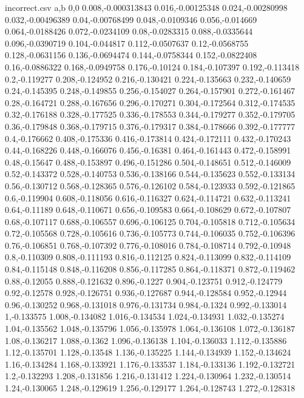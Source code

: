 \begin{filecontents*}{incorrect.csv}
a,b
0,0
0.008,-0.000313843
0.016,-0.00125348
0.024,-0.00280998
0.032,-0.00496389
0.04,-0.00768499
0.048,-0.0109346
0.056,-0.014669
0.064,-0.0188426
0.072,-0.0234109
0.08,-0.0283315
0.088,-0.0335644
0.096,-0.0390719
0.104,-0.044817
0.112,-0.0507637
0.12,-0.0568755
0.128,-0.0631156
0.136,-0.0694474
0.144,-0.0758344
0.152,-0.0822408
0.16,-0.0886322
0.168,-0.0949758
0.176,-0.10124
0.184,-0.107397
0.192,-0.113418
0.2,-0.119277
0.208,-0.124952
0.216,-0.130421
0.224,-0.135663
0.232,-0.140659
0.24,-0.145395
0.248,-0.149855
0.256,-0.154027
0.264,-0.157901
0.272,-0.161467
0.28,-0.164721
0.288,-0.167656
0.296,-0.170271
0.304,-0.172564
0.312,-0.174535
0.32,-0.176188
0.328,-0.177525
0.336,-0.178553
0.344,-0.179277
0.352,-0.179705
0.36,-0.179848
0.368,-0.179715
0.376,-0.179317
0.384,-0.178666
0.392,-0.177777
0.4,-0.176662
0.408,-0.175336
0.416,-0.173814
0.424,-0.172111
0.432,-0.170243
0.44,-0.168226
0.448,-0.166076
0.456,-0.16381
0.464,-0.161443
0.472,-0.158991
0.48,-0.15647
0.488,-0.153897
0.496,-0.151286
0.504,-0.148651
0.512,-0.146009
0.52,-0.143372
0.528,-0.140753
0.536,-0.138166
0.544,-0.135623
0.552,-0.133134
0.56,-0.130712
0.568,-0.128365
0.576,-0.126102
0.584,-0.123933
0.592,-0.121865
0.6,-0.119904
0.608,-0.118056
0.616,-0.116327
0.624,-0.114721
0.632,-0.113241
0.64,-0.11189
0.648,-0.110671
0.656,-0.109583
0.664,-0.108629
0.672,-0.107807
0.68,-0.107117
0.688,-0.106557
0.696,-0.106125
0.704,-0.105818
0.712,-0.105634
0.72,-0.105568
0.728,-0.105616
0.736,-0.105773
0.744,-0.106035
0.752,-0.106396
0.76,-0.106851
0.768,-0.107392
0.776,-0.108016
0.784,-0.108714
0.792,-0.10948
0.8,-0.110309
0.808,-0.111193
0.816,-0.112125
0.824,-0.113099
0.832,-0.114109
0.84,-0.115148
0.848,-0.116208
0.856,-0.117285
0.864,-0.118371
0.872,-0.119462
0.88,-0.12055
0.888,-0.121632
0.896,-0.1227
0.904,-0.123751
0.912,-0.124779
0.92,-0.12578
0.928,-0.126751
0.936,-0.127687
0.944,-0.128584
0.952,-0.12944
0.96,-0.130252
0.968,-0.131018
0.976,-0.131734
0.984,-0.1324
0.992,-0.133014
1,-0.133575
1.008,-0.134082
1.016,-0.134534
1.024,-0.134931
1.032,-0.135274
1.04,-0.135562
1.048,-0.135796
1.056,-0.135978
1.064,-0.136108
1.072,-0.136187
1.08,-0.136217
1.088,-0.1362
1.096,-0.136138
1.104,-0.136033
1.112,-0.135886
1.12,-0.135701
1.128,-0.13548
1.136,-0.135225
1.144,-0.134939
1.152,-0.134624
1.16,-0.134284
1.168,-0.133921
1.176,-0.133537
1.184,-0.133136
1.192,-0.132721
1.2,-0.132293
1.208,-0.131856
1.216,-0.131412
1.224,-0.130964
1.232,-0.130514
1.24,-0.130065
1.248,-0.129619
1.256,-0.129177
1.264,-0.128743
1.272,-0.128318

\end{filecontents*}
